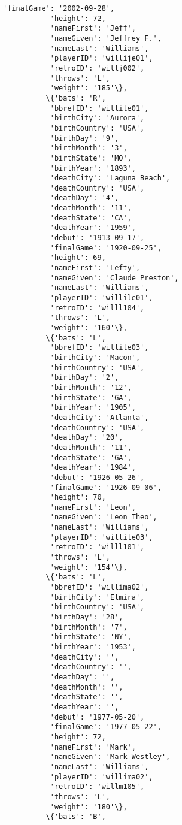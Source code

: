 \documentclass[11pt]{article}
\begin{document}
\begin{Verbatim}[commandchars=\\\{\}]
           'finalGame': '2002-09-28',
           'height': 72,
           'nameFirst': 'Jeff',
           'nameGiven': 'Jeffrey F.',
           'nameLast': 'Williams',
           'playerID': 'willije01',
           'retroID': 'willj002',
           'throws': 'L',
           'weight': '185'\},
          \{'bats': 'R',
           'bbrefID': 'willile01',
           'birthCity': 'Aurora',
           'birthCountry': 'USA',
           'birthDay': '9',
           'birthMonth': '3',
           'birthState': 'MO',
           'birthYear': '1893',
           'deathCity': 'Laguna Beach',
           'deathCountry': 'USA',
           'deathDay': '4',
           'deathMonth': '11',
           'deathState': 'CA',
           'deathYear': '1959',
           'debut': '1913-09-17',
           'finalGame': '1920-09-25',
           'height': 69,
           'nameFirst': 'Lefty',
           'nameGiven': 'Claude Preston',
           'nameLast': 'Williams',
           'playerID': 'willile01',
           'retroID': 'willl104',
           'throws': 'L',
           'weight': '160'\},
          \{'bats': 'L',
           'bbrefID': 'willile03',
           'birthCity': 'Macon',
           'birthCountry': 'USA',
           'birthDay': '2',
           'birthMonth': '12',
           'birthState': 'GA',
           'birthYear': '1905',
           'deathCity': 'Atlanta',
           'deathCountry': 'USA',
           'deathDay': '20',
           'deathMonth': '11',
           'deathState': 'GA',
           'deathYear': '1984',
           'debut': '1926-05-26',
           'finalGame': '1926-09-06',
           'height': 70,
           'nameFirst': 'Leon',
           'nameGiven': 'Leon Theo',
           'nameLast': 'Williams',
           'playerID': 'willile03',
           'retroID': 'willl101',
           'throws': 'L',
           'weight': '154'\},
          \{'bats': 'L',
           'bbrefID': 'willima02',
           'birthCity': 'Elmira',
           'birthCountry': 'USA',
           'birthDay': '28',
           'birthMonth': '7',
           'birthState': 'NY',
           'birthYear': '1953',
           'deathCity': '',
           'deathCountry': '',
           'deathDay': '',
           'deathMonth': '',
           'deathState': '',
           'deathYear': '',
           'debut': '1977-05-20',
           'finalGame': '1977-05-22',
           'height': 72,
           'nameFirst': 'Mark',
           'nameGiven': 'Mark Westley',
           'nameLast': 'Williams',
           'playerID': 'willima02',
           'retroID': 'willm105',
           'throws': 'L',
           'weight': '180'\},
          \{'bats': 'B',

\end{Verbatim}
\end{document}
